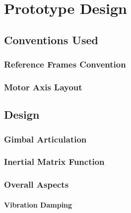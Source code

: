 \chapter{Prototype Design}
\label{ch:proto}
\section{Conventions Used}
\label{sec:proto.conventions}
\subsection{Reference Frames Convention}
\label{subsec:proto.conventions.frames}
\subsection{Motor Axis Layout}
\label{subsec:proto.conventions.motoraxis}

\section{Design}
\label{sec:proto.design}
\subsection{Gimbal Articulation}
\label{subsec:proto.design.actuation}
\subsection{Inertial Matrix Function}
\label{subsec:proto.design.inertia}
\subsection{Overall Aspects}
\label{subsec:proto.design.aspects}
\subsubsection{Vibration Damping}
